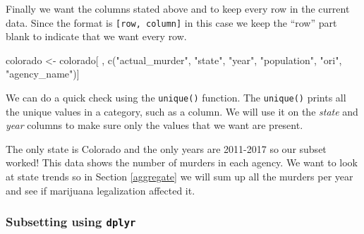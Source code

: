 \documentclass[
]{krantz}
\makeatletter
\newenvironment{Shaded}{\begin{snugshade}}{\end{snugshade}}
\newcommand{\CommentTok}[1]{\textcolor[rgb]{0.37,0.37,0.37}{\textit{#1}}}
\newcommand{\FunctionTok}[1]{\textcolor[rgb]{0,0,0}{#1}}
\newcommand{\NormalTok}[1]{#1}
\newcommand{\OtherTok}[1]{\textcolor[rgb]{0.37,0.37,0.37}{#1}}
\newcommand{\SpecialCharTok}[1]{\textcolor[rgb]{0,0,0}{#1}}
\newcommand{\StringTok}[1]{\textcolor[rgb]{0.5,0.5,0.5}{#1}}
\newenvironment{kframe}{%
\medskip{}
\setlength{\fboxsep}{.8em}
 \def\at@end@of@kframe{}%
 \ifinner\ifhmode%
  \def\at@end@of@kframe{\end{minipage}}%
  \begin{minipage}{\columnwidth}%
 \fi\fi%
 \def\FrameCommand##1{\hskip\@totalleftmargin \hskip-\fboxsep
 \colorbox{shadecolor}{##1}\hskip-\fboxsep
     \hskip-\linewidth \hskip-\@totalleftmargin \hskip\columnwidth}%
 \MakeFramed {\advance\hsize-\width
   \@totalleftmargin\z@ \linewidth\hsize
   \@setminipage}}%
 {\par\unskip\endMakeFramed%
 \at@end@of@kframe}
\renewenvironment{Shaded}{\begin{kframe}}{\end{kframe}}
\makeatother
\begin{document}
Finally we want the columns stated above and to keep every row in the current data. Since the format is \texttt{{[}row,\ column{]}} in this case we keep the ``row'' part blank to indicate that we want every row.

\begin{Shaded}
\begin{Highlighting}[]
\NormalTok{colorado }\OtherTok{\textless{}{-}}\NormalTok{ colorado[ , }\FunctionTok{c}\NormalTok{(}\StringTok{"actual\_murder"}\NormalTok{, }\StringTok{"state"}\NormalTok{, }\StringTok{"year"}\NormalTok{, }\StringTok{"population"}\NormalTok{, }\StringTok{"ori"}\NormalTok{, }\StringTok{"agency\_name"}\NormalTok{)]}
\end{Highlighting}
\end{Shaded}

We can do a quick check using the \texttt{unique()} function. The \texttt{unique()} prints all the unique values in a category, such as a column. We will use it on the \emph{state} and \emph{year} columns to make sure only the values that we want are present.

\begin{Shaded}
\end{Shaded}

\begin{Shaded}
\end{Shaded}

The only state is Colorado and the only years are 2011-2017 so our subset worked! This data shows the number of murders in each agency. We want to look at state trends so in Section \ref{aggregate} we will sum up all the murders per year and see if marijuana legalization affected it.

\hypertarget{subsetting-using-dplyr}{%
\subsubsection{\texorpdfstring{Subsetting using \texttt{dplyr}}{Subsetting using dplyr}}\label{subsetting-using-dplyr}}
\end{document}

